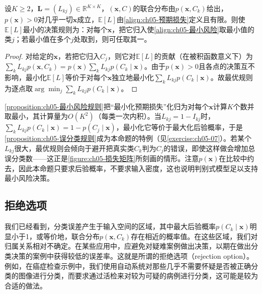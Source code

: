 \documentclass[../../main.tex]{subfiles}
\begin{document}
\begin{proposition}[最小预期损失决策规则]\label{proposition:ch05-最小风险规则}
设$K\geqslant2$，$\boldsymbol{L}=(L_{kj})\in\mathbb{R}^{K\times K}$，$(\boldsymbol{x},C)$的联合分布由$p(\boldsymbol{x},C_k)$给出，$p(\boldsymbol{x})>0$对几乎一切$\boldsymbol{x}$成立，$\mathbb{E}[L]$由\eqref{align:ch05-预期损失}定义且有限。则使$\mathbb{E}[L]$最小的决策规则为：对每个$\boldsymbol{x}$，把它归入使\eqref{align:ch05-最小风险}取最小值的类$j$；若最小值在多个$j$处取到，则可任取其一。
\end{proposition}

\begin{proof}
对给定的$\boldsymbol{x}$，若把它归入$C_j$，则它对$\mathbb{E}[L]$的贡献（在被积函数意义下）为$\sum_k L_{kj}p(\boldsymbol{x},C_k)=p(\boldsymbol{x})\sum_k L_{kj}p(C_k\mid\boldsymbol{x})$。由于$p(\boldsymbol{x})>0$且各点的决策互不影响，最小化$\mathbb{E}[L]$等价于对每个$\boldsymbol{x}$独立地最小化$\sum_k L_{kj}p(C_k\mid\boldsymbol{x})$。故最优规则为逐点取$\arg\min_j\sum_k L_{kj}p(C_k\mid\boldsymbol{x})$。
\end{proof}

\begin{remark}
\cref{proposition:ch05-最小风险规则}把“最小化预期损失”化归为对每个$\boldsymbol{x}$计算$K$个数并取最小，其计算量为$O(K^{2})$（每类一次内积）。当$L_{kj}=1-I_{kj}$时，$\sum_k L_{kj}p(C_k\mid\boldsymbol{x})=1-p(C_j\mid\boldsymbol{x})$，最小化它等价于最大化后验概率，于是\cref{proposition:ch05-误分类规则}成为本命题的特例（见\cref{exercise:ch05-07}）。若某个$L_{kj}$很大，最优规则会倾向于避开把真实类$C_k$判为$C_j$的错误，即使这样做会增加总误分类数——这正是\cref{figure:ch05-损失矩阵}所刻画的情形。注意$p(\boldsymbol{x})$在比较中约去，因此本命题只要求后验概率，不要求输入密度，这也说明判别式模型足以支持最小风险决策。
\end{remark}

\subsection{拒绝选项}\label{subsection:ch05-拒绝选项}

我们已经看到，分类误差产生于输入空间的区域，其中最大后验概率$p(C_k\mid\boldsymbol{x})$明显小于1，或等价地，联合分布$p(\boldsymbol{x},C_k)$存在相近的概率值。在这些区域，我们对归属关系相对不确定。在某些应用中，应避免对疑难案例做出决策，以期在做出分类决策的案例中获得较低的误差率。这就是所谓的拒绝选项（rejection option）。例如，在癌症检查示例中，我们使用自动系统对那些几乎不需要怀疑是否被正确分类的图像进行分类，而要求通过活检来对较为可疑的病例进行分类，这可能是较为合适的做法。
\end{document}
